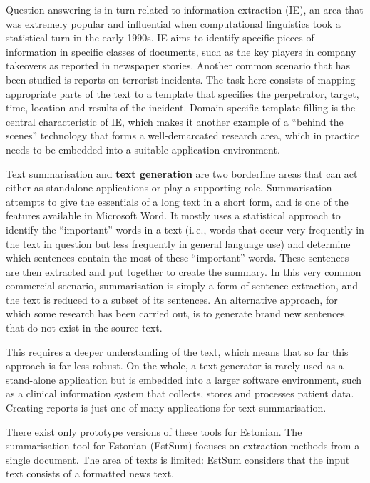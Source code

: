 \begin{multicols}{2}
Question answering is in turn related to information extraction (IE), an area that was extremely popular and influential when computational linguistics took a statistical turn in the early 1990s. IE aims to identify specific pieces of information in specific classes of documents, such as the key players in company takeovers as reported in newspaper stories. Another common scenario that has been studied is reports on terrorist incidents. The task here consists of mapping appropriate parts of the text to a template that specifies the perpetrator, target, time, location and results of the incident. Domain-specific template-filling is the central characteristic of IE, which makes it another example of a ``behind the scenes'' technology that forms a well-demarcated research area, which in practice needs to be embedded into a suitable application environment. 

    Text summarisation and \textbf{text generation} are two borderline areas that can act either as standalone applications or play a supporting role. Summarisation attempts to give the essentials of a long text in a short form, and is one of the features available in Microsoft Word. It mostly uses a statistical approach to identify the ``important'' words in a text (i.\,e., words that occur very frequently in the text in question but less frequently in general language use) and determine which sentences contain the most of these ``important'' words. These sentences are then extracted and put together to create the summary. In this very common commercial scenario, summarisation is simply a form of sentence extraction, and the text is reduced to a subset of its sentences. An alternative approach, for which some research has been carried out, is to generate brand new sentences that do not exist in the source text. 

This requires a deeper understanding of the text, which means that so far this approach is far less robust. On the whole, a text generator is rarely used as a stand-alone application but is embedded into a larger software environment, such as a clinical information system that collects, stores and processes patient data. Creating reports is just one of many applications for text summarisation. 

There exist only prototype versions of these tools for Estonian. 
The summarisation tool for Estonian (EstSum) focuses on extraction methods from a single document. 
The area of texts is limited: EstSum considers that the input text consists of a formatted news text. 


\end{multicols}
